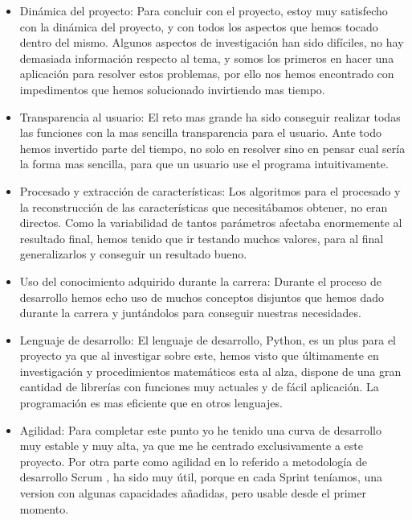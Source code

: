 \begin{itemize}
\item Dinámica del proyecto: Para concluir con el proyecto, estoy muy satisfecho con la dinámica del proyecto, y con todos los aspectos que hemos tocado dentro del mismo.
Algunos aspectos de investigación han sido difíciles, no hay demasiada información respecto al tema, y somos los primeros en hacer una aplicación para resolver estos problemas, por ello nos hemos encontrado con impedimentos que hemos solucionado invirtiendo mas tiempo.

\item Transparencia al usuario: El reto mas grande ha sido conseguir realizar todas las funciones con la mas sencilla transparencia para el usuario. Ante todo hemos invertido parte del tiempo, no solo en resolver sino en pensar cual sería la forma mas sencilla, para que un usuario use el programa intuitivamente. 

\item Procesado y extracción de características: Los algoritmos para el procesado y la reconstrucción de las características que necesitábamos obtener, no eran directos. Como la variabilidad de tantos parámetros afectaba enormemente al resultado final, hemos tenido que ir testando muchos valores, para al final generalizarlos y conseguir un resultado bueno.

\item Uso del conocimiento adquirido durante la carrera: Durante el proceso de desarrollo hemos echo uso de muchos conceptos disjuntos que hemos dado durante la carrera y juntándolos para conseguir nuestras necesidades.

\item Lenguaje de desarrollo: El lenguaje de desarrollo, Python, es un plus para el proyecto ya que al investigar sobre este, hemos visto que últimamente en investigación y procedimientos matemáticos esta al alza, dispone de una gran cantidad de librerías con funciones muy actuales y de fácil aplicación. La programación es mas eficiente que en otros lenguajes.

\item Agilidad: Para completar este punto yo he tenido una curva de desarrollo muy estable y muy alta, ya que me he centrado exclusivamente a este proyecto.
Por otra parte como agilidad en lo referido a metodología de desarrollo Scrum \cite{Scrum}, ha sido muy útil, porque en cada Sprint teníamos, una version con algunas capacidades añadidas, pero usable desde el primer momento.


\end{itemize}
